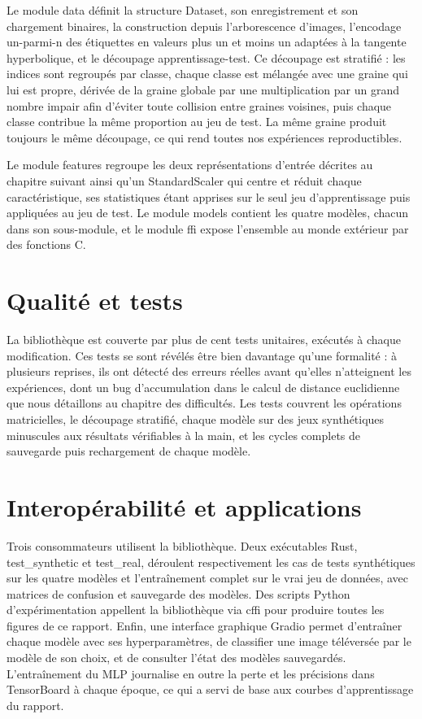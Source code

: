 \documentclass[11pt,a4paper]{report}
\begin{document}
Le module data définit la structure Dataset, son enregistrement et son
chargement binaires, la construction depuis l'arborescence d'images,
l'encodage un-parmi-n des étiquettes en valeurs plus un et moins un
adaptées à la tangente hyperbolique, et le découpage apprentissage-test.
Ce découpage est stratifié : les indices sont regroupés par classe,
chaque classe est mélangée avec une graine qui lui est propre, dérivée
de la graine globale par une multiplication par un grand nombre impair
afin d'éviter toute collision entre graines voisines, puis chaque classe
contribue la même proportion au jeu de test. La même graine produit
toujours le même découpage, ce qui rend toutes nos expériences
reproductibles.

Le module features regroupe les deux représentations d'entrée décrites
au chapitre suivant ainsi qu'un StandardScaler qui centre et réduit
chaque caractéristique, ses statistiques étant apprises sur le seul jeu
d'apprentissage puis appliquées au jeu de test. Le module models
contient les quatre modèles, chacun dans son sous-module, et le module
ffi expose l'ensemble au monde extérieur par des fonctions C.

\hypertarget{qualituxe9-et-tests}{%
\section{Qualité et tests}\label{qualituxe9-et-tests}}

La bibliothèque est couverte par plus de cent tests unitaires, exécutés
à chaque modification. Ces tests se sont révélés être bien davantage
qu'une formalité : à plusieurs reprises, ils ont détecté des erreurs
réelles avant qu'elles n'atteignent les expériences, dont un bug
d'accumulation dans le calcul de distance euclidienne que nous
détaillons au chapitre des difficultés. Les tests couvrent les
opérations matricielles, le découpage stratifié, chaque modèle sur des
jeux synthétiques minuscules aux résultats vérifiables à la main, et les
cycles complets de sauvegarde puis rechargement de chaque modèle.

\hypertarget{interopuxe9rabilituxe9-et-applications}{%
\section{Interopérabilité et
applications}\label{interopuxe9rabilituxe9-et-applications}}

Trois consommateurs utilisent la bibliothèque. Deux exécutables Rust,
test\_synthetic et test\_real, déroulent respectivement les cas de tests
synthétiques sur les quatre modèles et l'entraînement complet sur le
vrai jeu de données, avec matrices de confusion et sauvegarde des
modèles. Des scripts Python d'expérimentation appellent la bibliothèque
via cffi pour produire toutes les figures de ce rapport. Enfin, une
interface graphique Gradio permet d'entraîner chaque modèle avec ses
hyperparamètres, de classifier une image téléversée par le modèle de son
choix, et de consulter l'état des modèles sauvegardés. L'entraînement du
MLP journalise en outre la perte et les précisions dans TensorBoard à
chaque époque, ce qui a servi de base aux courbes d'apprentissage du
rapport.
\end{document}
